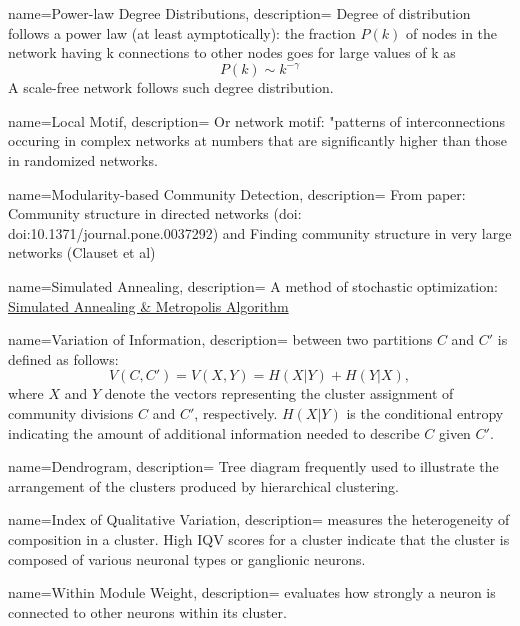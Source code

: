
{
  name=Power-law Degree Distributions,
  description={ Degree of distribution follows a power law (at least aymptotically):
	the fraction $ P(k) $ of nodes in the network having k connections to other nodes goes for large values of k as
	$$ P(k) \sim k^{- \gamma} $$
	A scale-free network follows such degree distribution.
  }
}

{
  name=Local Motif,
  description={ Or network motif: "patterns of interconnections occuring in complex networks at numbers
  	that are significantly higher than those in randomized networks.
  }
}

{
  name=Modularity-based Community Detection,
  description={ From paper: Community structure in directed networks
	(doi: doi:10.1371/journal.pone.0037292)
	and Finding community structure in very large networks (Clauset et al)
  }
}

{
  name=Simulated Annealing,
  description={ A method of stochastic optimization:
	\href{run:../readings/Metropolis_hmc.pdf}{Simulated Annealing \& Metropolis Algorithm}
  }
}

{
  name=Variation of Information,
  description={ between two partitions $C$ and $C'$ is defined as follows:
  	$$ V(C, C') = V(X, Y) = H(X | Y) + H(Y | X) ,$$
  	where $X$ and $Y$ denote the vectors representing the cluster assignment of community divisions
  	$C$ and $C'$, respectively. $ H(X | Y) $ is the conditional entropy indicating the amount of 
  	additional information needed to describe $C$ given $C'$.
  }
}

{
  name=Dendrogram,
  description={ Tree diagram frequently used to illustrate the arrangement of the clusters produced by
	hierarchical clustering.
  }
}

{
  name=Index of Qualitative Variation,
  description={ measures the heterogeneity of composition in a cluster. High IQV scores for a cluster indicate that the cluster is composed of
various neuronal types or ganglionic neurons.
  }
}

{
  name=Within Module Weight,
  description={ evaluates how strongly a neuron is connected to other neurons within its cluster. }
}

